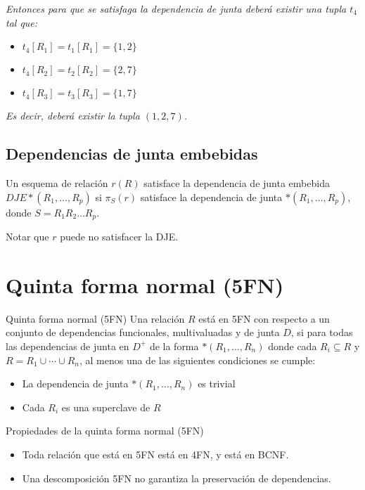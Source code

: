 \documentclass[a4paper, twoside]{article}
\begin{document}
\emph{Entonces para que se satisfaga la dependencia de junta deberá existir una tupla $t_{4}$ tal que:}
\begin{itemize}
	\item \emph{$t_{4}\left[R_{1}\right]=t_{1}\left[R_{1}\right]=\{1,2\}$}
	\item \emph{$t_{4}\left[R_{2}\right]=t_{2}\left[R_{2}\right]=\{2,7\}$}
	\item \emph{$t_{4}\left[R_{3}\right]=t_{3}\left[R_{3}\right]=\{1,7\}$}
\end{itemize}

\emph{Es decir, deberá existir la tupla $\left(1,2,7\right)$.}

\subsection{Dependencias de junta embebidas}
Un esquema de relación $r(R)$ satisface la dependencia de junta embebida $DJE*\left(R_{1},\ldots,R_{p}\right)$ si $\pi_{S}(r)$ satisface la dependencia de junta $*\left(R_{1},\ldots,R_{p}\right)$, donde $S=R_{1}R_{2}\ldots R_{p}$.

Notar que $r$ puede no satisfacer la DJE.

\section{Quinta forma normal (5FN)}
\begin{definicion}[0.9\textwidth]{Quinta forma normal (5FN)}
	Una relación $R$ está en 5FN con respecto a un conjunto de dependencias funcionales, multivaluadas y de junta $D$, si para todas las dependencias de junta en $D^{+}$ de la forma $*\left( R_{1}, \ldots, R_{n} \right)$ donde cada $R_{i} \subseteq R$ y $R = R_{1} \cup \cdots \cup R_{n}$, al menos una de las siguientes condiciones se cumple:
	\begin{itemize}
		\item La dependencia de junta $*\left(R_{1},\ldots,R_{n}\right)$ es trivial
		\item Cada $R_{i}$ es una superclave de $R$
	\end{itemize}
\end{definicion}

\begin{propiedades}[0.9\textwidth]{Propiedades de la quinta forma normal (5FN)}
	\begin{itemize}
		\item Toda relación que está en 5FN está en 4FN, y está en BCNF.
		\item Una descomposición 5FN no garantiza la preservación de dependencias.
	\end{itemize}
\end{propiedades}
\end{document}

